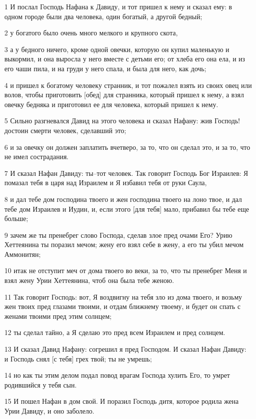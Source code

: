 \par 1 И послал Господь Нафана к Давиду, и тот пришел к нему и сказал ему: в одном городе были два человека, один богатый, а другой бедный;
\par 2 у богатого было очень много мелкого и крупного скота,
\par 3 а у бедного ничего, кроме одной овечки, которую он купил маленькую и выкормил, и она выросла у него вместе с детьми его; от хлеба его она ела, и из его чаши пила, и на груди у него спала, и была для него, как дочь;
\par 4 и пришел к богатому человеку странник, и тот пожалел взять из своих овец или волов, чтобы приготовить [обед] для странника, который пришел к нему, а взял овечку бедняка и приготовил ее для человека, который пришел к нему.
\par 5 Сильно разгневался Давид на этого человека и сказал Нафану: жив Господь! достоин смерти человек, сделавший это;
\par 6 и за овечку он должен заплатить вчетверо, за то, что он сделал это, и за то, что не имел сострадания.
\par 7 И сказал Нафан Давиду: ты--тот человек. Так говорит Господь Бог Израилев: Я помазал тебя в царя над Израилем и Я избавил тебя от руки Саула,
\par 8 и дал тебе дом господина твоего и жен господина твоего на лоно твое, и дал тебе дом Израилев и Иудин, и, если этого [для тебя] мало, прибавил бы тебе еще больше;
\par 9 зачем же ты пренебрег слово Господа, сделав злое пред очами Его? Урию Хеттеянина ты поразил мечом; жену его взял себе в жену, а его ты убил мечом Аммонитян;
\par 10 итак не отступит меч от дома твоего во веки, за то, что ты пренебрег Меня и взял жену Урии Хеттеянина, чтоб она была тебе женою.
\par 11 Так говорит Господь: вот, Я воздвигну на тебя зло из дома твоего, и возьму жен твоих пред глазами твоими, и отдам ближнему твоему, и будет он спать с женами твоими пред этим солнцем;
\par 12 ты сделал тайно, а Я сделаю это пред всем Израилем и пред солнцем.
\par 13 И сказал Давид Нафану: согрешил я пред Господом. И сказал Нафан Давиду: и Господь снял [с тебя] грех твой; ты не умрешь;
\par 14 но как ты этим делом подал повод врагам Господа хулить Его, то умрет родившийся у тебя сын.
\par 15 И пошел Нафан в дом свой. И поразил Господь дитя, которое родила жена Урии Давиду, и оно заболело.
